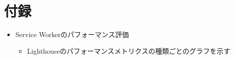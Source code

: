\section*{付録}
\begin{itemize}
  \item Service Workerのパフォーマンス評価
  \begin{itemize}
    \item Lighthouseのパフォーマンスメトリクスの種類ごとのグラフを示す
  \end{itemize}
\end{itemize}